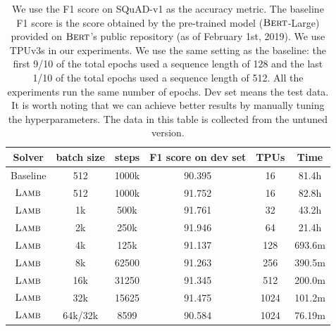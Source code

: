 \begin{table}[ht]
\renewcommand{\arraystretch}{1.3}
\caption{ We use the F1 score on SQuAD-v1 as the accuracy metric. The baseline F1 score is the score obtained by the pre-trained model ($\textsc{Bert}$-Large) provided on $\textsc{Bert}$'s public repository (as of February 1st, 2019). We use TPUv3s in our experiments. We use the same setting as the baseline: the first 9/10 of the total epochs used a sequence length of 128 and the last 1/10 of the total epochs used a sequence length of 512. All the experiments run the same number of epochs. Dev set means the test data. It is worth noting that we can achieve better results by manually tuning the hyperparameters. The data in this table is collected from the untuned version.}
\centering
 
\begin{tabular}{|c|c|c|c|c|c|}
\hline
Solver & batch size & steps & F1 score on dev set & TPUs & Time\\
\hline
\hline
Baseline & 512 & 1000k & 90.395 & 16 & 81.4h\\
\hline
$\textsc{Lamb}$ & 512 & 1000k & 91.752 & 16 & 82.8h\\
\hline
$\textsc{Lamb}$ & 1k & 500k & 91.761 & 32 & 43.2h\\
\hline
$\textsc{Lamb}$ & 2k & 250k & 91.946 & 64 & 21.4h\\
\hline
$\textsc{Lamb}$ & 4k & 125k & 91.137 & 128 & 693.6m\\
\hline
$\textsc{Lamb}$ & 8k & 62500 & 91.263 & 256 & 390.5m\\
\hline
$\textsc{Lamb}$ & 16k & 31250 & 91.345 & 512 & 200.0m\\
\hline
$\textsc{Lamb}$ & 32k & 15625 & 91.475 & 1024 & 101.2m\\
\hline
\hline
$\textsc{Lamb}$ & 64k/32k & 8599 & 90.584 & 1024 & 76.19m\\
\hline
\end{tabular}
\label{table:results}
\end{table}





